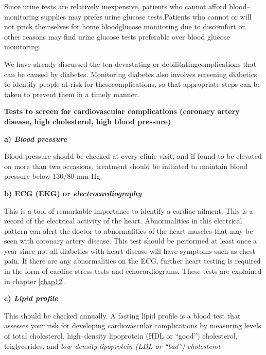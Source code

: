 Since urine tests are relatively inexpensive, patients who cannot afford blood–monitoring supplies may prefer urine glucose tests.\break Patients who cannot or will not prick themselves for home blood\break glucose monitoring due to discomfort or other reasons may find urine glucose tests preferable over blood glucose monitoring.


We have already discussed the ten devastating or debilitating\break complications that can be caused by diabetes. Monitoring diabetes also involves screening diabetics to identify people at risk for these\break complications, so that appropriate steps can be taken to prevent them in a timely manner.

\noindent\textbf{Tests to screen for cardiovascular complications (coronary artery disease, high cholesterol, high blood pressure)}

\noindent\textbf{a) \textit{Blood pressure}}

Blood pressure should be checked at every clinic visit, and if found to be elevated on more than two occasions, treatment should be ini\-tiated to maintain blood pressure below 130/80 mm Hg.

\noindent\textbf{b) ECG (EKG) or \textit{electrocardiography}}

This is a tool of remarkable importance to identify a cardiac ailment. This is a record of the electrical activity of the heart. Abnormalities in this electrical pattern can alert the doctor to abnormalities of the heart muscles that may be seen with coronary artery disease. This test should be performed at least once a year since not all diabetics with heart disease will have symptoms such as chest pain. If there are any abnormalities on the ECG, further heart testing is required in the form of cardiac stress tests and echocardiograms. These tests are explained in chapter \ref{chap12}.

\noindent\textbf{c) \textit{Lipid profile}}

This should be checked annually. A fasting lipid profile is a blood test that assesses your risk for developing cardiovascular complications by measuring levels of total cholesterol, high–density lipoprotein (HDL or “good”) cholesterol, triglycerides, and \textit{low–density lipoprotein (LDL or “bad”) cholesterol}.

